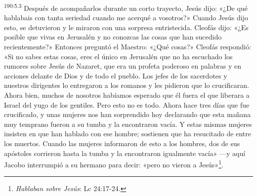 \par
\textsuperscript{190:5.3} Después de acompañarlos durante un corto trayecto, Jesús dijo: «¿De qué hablabais con tanta seriedad cuando me acerqué a vosotros?» Cuando Jesús dijo esto, se detuvieron y le miraron con una sorpresa entristecida. Cleofás dijo: «¿Es posible que vivas en Jerusalén y no conozcas las cosas que han sucedido recientemente?» Entonces preguntó el Maestro: «¿Qué cosas?» Cleofás respondió: «Si no sabes estas cosas, eres el único en Jerusalén que no ha escuchado los rumores sobre Jesús de Nazaret, que era un profeta poderoso en palabras y en acciones delante de Dios y de todo el pueblo. Los jefes de los sacerdotes y nuestros dirigentes lo entregaron a los romanos y les pidieron que lo crucificaran. Ahora bien, muchos de nosotros habíamos esperado que él fuera el que liberara a Israel del yugo de los gentiles. Pero esto no es todo. Ahora hace tres días que fue crucificado, y unas mujeres nos han sorprendido hoy declarando que esta mañana muy temprano fueron a su tumba y la encontraron vacía. Y estas mismas mujeres insisten en que han hablado con ese hombre; sostienen que ha resucitado de entre los muertos. Cuando las mujeres informaron de esto a los hombres, dos de sus apóstoles corrieron hasta la tumba y la encontraron igualmente vacía» ---y aquí Jacobo interrumpió a su hermano para decir: «pero no vieron a Jesús»\footnote{\textit{Hablaban sobre Jesús}: Lc 24:17-24.}.

